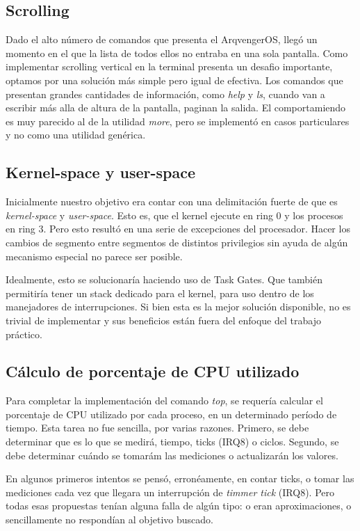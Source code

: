\documentclass[a4paper,10pt]{article}
\begin{document}
      \subsection{Scrolling}
      Dado el alto número de comandos que presenta el ArqvengerOS, llegó un momento en el que la lista de todos ellos no entraba en una sola pantalla.
      Como implementar scrolling vertical en la terminal presenta un desafio importante, optamos por una solución más simple pero igual de efectiva.
      Los comandos que presentan grandes cantidades de información, como \textit{help} y \textit{ls}, cuando van a escribir más alla de altura de la pantalla, 
      paginan la salida.
      El comportamiendo es muy parecido al de la utilidad \textit{more}, pero se implementó en casos particulares y no como una utilidad genérica.

      \subsection{Kernel-space y user-space}
      Inicialmente nuestro objetivo era contar con una delimitación fuerte de que es \textit{kernel-space} y \textit{user-space}.
      Esto es, que el kernel ejecute en ring 0 y los procesos en ring 3.
      Pero esto resultó en una serie de excepciones del procesador.
      Hacer los cambios de segmento entre segmentos de distintos privilegios sin ayuda de algún mecanismo especial no parece ser posible.

      Idealmente, esto se solucionaría haciendo uso de Task Gates.
      Que también permitiría tener un stack dedicado para el kernel, para uso dentro de los manejadores de interrupciones.
      Si bien esta es la mejor solución disponible, no es trivial de implementar y sus beneficios están fuera del enfoque del trabajo práctico.
      
      \subsection{Cálculo de porcentaje de CPU utilizado}
      Para completar la implementación del comando \textit{top}, se requería calcular el porcentaje de CPU utilizado por cada proceso, en un determinado
      período de tiempo. Esta tarea no fue sencilla, por varias razones. Primero, se debe determinar que es lo que se medirá, tiempo, ticks (IRQ8) o ciclos. 
      Segundo, se debe determinar cuándo se tomarám las mediciones o actualizarán los valores. 

      En algunos primeros intentos se pensó, erronéamente, en contar ticks, o tomar las mediciones cada vez que llegara un interrupción de \textit{timmer tick} (IRQ8).
      Pero todas esas propuestas tenían alguna falla de algún tipo: o eran aproximaciones, o sencillamente no respondían al objetivo buscado.
\end{document}
